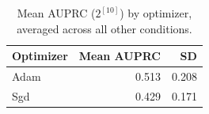 \begin{table}[ht]
\centering
\caption{Mean AUPRC ($2^{[10]}$) by optimizer, averaged across all other conditions.}
\label{tab:auprc_by_optimizer}
\begin{tabular}{lrr}
\toprule
Optimizer & Mean AUPRC & SD \\
\midrule
Adam & 0.513 & 0.208 \\
Sgd & 0.429 & 0.171 \\
\bottomrule
\end{tabular}
\end{table}